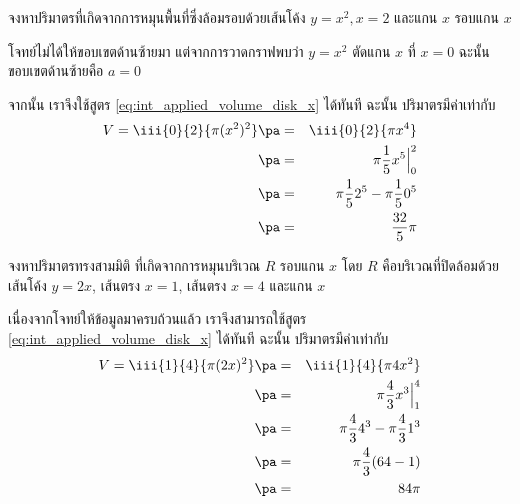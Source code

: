 \begin{frame}[t] 
\begin{ex} 
จงหาปริมาตรที่เกิดจากการหมุนพื้นที่ซึ่งล้อมรอบด้วยเส้นโค้ง $y=x^2, x=2$ และแกน $x$ รอบแกน $x$
\end{ex} 
\begin{sol}
โจทย์ไม่ได้ให้ขอบเขตด้านซ้ายมา แต่จากการวาดกราฟพบว่า $y=x^2$ ตัดแกน  $x$ ที่ $x=0$ ฉะนั้นขอบเขตด้านซ้ายคือ $a=0$ 

จากนั้น เราจึงใช้สูตร \eqref{eq:int_applied_volume_disk_x} ได้ทันที \pa ฉะนั้น ปริมาตรมีค่าเท่ากับ
\begin{eqnarray*}
V = \iii{0}{2}{\pi (x^2)^2} \pa &=& \iii{0}{2}{\pi x^4} \\
\pa &=& \pi \frac{1}{5} x^5 \Big|_0^2 \\
\pa &=& \pi \frac{1}{5} 2^5 - \pi \frac{1}{5} 0^5 \\
\pa &=& \frac{32}{5} \pi
\end{eqnarray*}
\end{sol}
\end{frame}

\begin{frame}
\end{frame}


\begin{frame}[t] 
\begin{ex} 
จงหาปริมาตรทรงสามมิติ ที่เกิดจากการหมุนบริเวณ $R$ รอบแกน $x$ โดย $R$ คือบริเวณที่ปิดล้อมด้วยเส้นโค้ง $y=2x$, เส้นตรง $x=1$, เส้นตรง $x=4$ และแกน $x$
\end{ex}
\begin{sol}
เนื่องจากโจทย์ให้ข้อมูลมาครบถ้วนแล้ว เราจึงสามารถใช้สูตร \eqref{eq:int_applied_volume_disk_x} ได้ทันที ฉะนั้น ปริมาตรมีค่าเท่ากับ
\begin{eqnarray*}
V = \iii{1}{4}{\pi (2x)^2} \pa &=& \iii{1}{4}{\pi 4x^2} \\
\pa &=& \pi \frac{4}{3} x^3 \Big|_1^4 \\
\pa &=& \pi \frac{4}{3} 4^3  - \pi \frac{4}{3} 1^3 \\
\pa &=& \pi \frac{4}{3} (64-1) \\
\pa &=& 84 \pi
\end{eqnarray*}
\end{sol}
\end{frame}

\begin{frame}
\end{frame}

